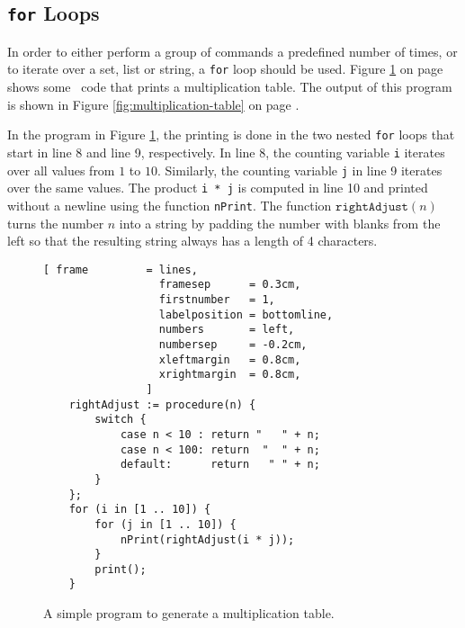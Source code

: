 \subsection{\texttt{for} Loops}
In order to either perform a group of commands a predefined number of times, or to iterate over a
set, list or string, a \texttt{for} loop should  be
used.  Figure \ref{fig:multiplication-table.stlx} on page \pageref{fig:multiplication-table.stlx}
shows some \setlx\ code that prints a multiplication table.  The output of this program is
shown in Figure \ref{fig:multiplication-table} on page \pageref{fig:multiplication-table}.

In the program in Figure \ref{fig:multiplication-table.stlx}, the printing is done in the two nested
\texttt{for} loops that start in line 8 and line 9, respectively.  In line 8, the counting variable
\texttt{i} iterates over all values 
from $1$ to $10$.  Similarly, the counting variable \texttt{j} in line 9 iterates over the same values.
The product \texttt{i * j} is computed in line 10 and printed without a newline using the
function \texttt{nPrint}.
The function $\texttt{rightAdjust}(n)$ turns the number $n$ into a string by padding the
number with blanks from the left so that the resulting string always has a length of 4 
characters.

\begin{figure}[!ht]
\centering
\begin{Verbatim}[ frame         = lines, 
                  framesep      = 0.3cm, 
                  firstnumber   = 1,
                  labelposition = bottomline,
                  numbers       = left,
                  numbersep     = -0.2cm,
                  xleftmargin   = 0.8cm,
                  xrightmargin  = 0.8cm,
                ]
    rightAdjust := procedure(n) {
        switch {
            case n < 10 : return "   " + n;
            case n < 100: return  "  " + n;
            default:      return   " " + n;
        }
    };      
    for (i in [1 .. 10]) {
        for (j in [1 .. 10]) {
            nPrint(rightAdjust(i * j));
        }
        print();
    }
\end{Verbatim}
\vspace*{-0.3cm}
\caption{A simple program to generate a multiplication table.}
\label{fig:multiplication-table.stlx}
\end{figure}

